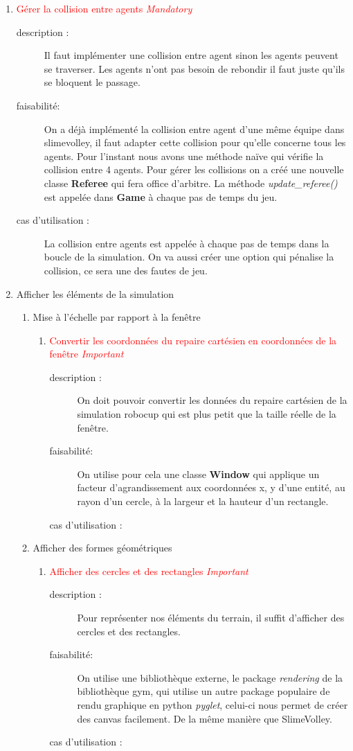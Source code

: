 \documentclass[11pt, a4paper]{article}
\newcommand{\besoinVItem}[4]{
	\item #1
	\begin{description}
		\item[description :]
		#2
		\item[faisabilité: ]
		#3
		\item[cas d'utilisation :]
		#4
	\end{description}
}
\begin{document}
\begin{enumerate}
\begin{enumerate}
		\end{enumerate}
		\besoinVItem{\textcolor{red}{Gérer la collision entre agents \textit{Mandatory}}
		}
		{Il faut implémenter une collision entre agent sinon les agents peuvent se traverser. Les agents n'ont pas besoin de rebondir il faut juste qu'ils se bloquent le passage.
		}
		{On a déjà implémenté la collision entre agent d'une même équipe dans slimevolley, il faut adapter cette collision pour qu'elle concerne tous les agents. Pour l'instant nous avons une méthode naïve qui vérifie la collision entre 4 agents. Pour gérer les collisions on a créé une nouvelle classe \textbf{Referee} qui fera office d'arbitre. La méthode \textit{update\_referee()} est appelée dans \textbf{Game} à chaque pas de temps du jeu.
		}
		{La collision entre agents est appelée à chaque pas de temps dans la boucle de la simulation. On va aussi créer une option qui pénalise la collision, ce sera une des fautes de jeu. \\ }
		\item Afficher les éléments de la simulation
		\begin{enumerate}
			\item Mise à l'échelle par rapport à la fenêtre
			\begin{enumerate}
				\besoinVItem{\textcolor{red}{Convertir les coordonnées du repaire cartésien en coordonnées de la fenêtre \textit{Important}}
				}
				{On doit pouvoir convertir les données du repaire cartésien de la simulation robocup qui est plus petit que la taille réelle de
				la fenêtre.

				}
				{On utilise pour cela une classe \textbf{Window} qui applique un facteur d'agrandissement aux coordonnées x, y d'une entité,
					au rayon d'un cercle, à la largeur et la hauteur d'un rectangle.
				}
				{}

			\end{enumerate}

			\item Afficher des formes géométriques

			\begin{enumerate}
				\besoinVItem{\textcolor{red}{Afficher des cercles et des rectangles \textit{Important}}
				}
				{Pour représenter nos éléments du terrain, il suffit d'afficher des cercles et des rectangles.

				}
				{On utilise une bibliothèque externe, le package \textit{rendering} de la bibliothèque gym, qui utilise un autre package populaire de rendu graphique en python \textit{pyglet}, celui-ci nous permet de créer des canvas facilement. De la même manière que SlimeVolley.
				}
				{}


\end{enumerate}
\end{enumerate}
\end{enumerate}
\end{document}
